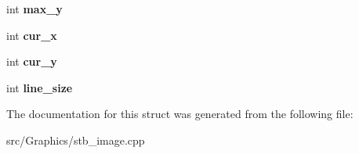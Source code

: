 \begin{DoxyCompactItemize}
\item 
\hypertarget{structstbi__gif__struct_aff3410e0fff097d4719e54096f6da69b}{int {\bfseries max\+\_\+y}}\label{structstbi__gif__struct_aff3410e0fff097d4719e54096f6da69b}

\item 
\hypertarget{structstbi__gif__struct_adbc7ae7e9ff2e2abdf66eb0e1a4b3ffb}{int {\bfseries cur\+\_\+x}}\label{structstbi__gif__struct_adbc7ae7e9ff2e2abdf66eb0e1a4b3ffb}

\item 
\hypertarget{structstbi__gif__struct_ac61865216c4b578c235f5b8170c2036c}{int {\bfseries cur\+\_\+y}}\label{structstbi__gif__struct_ac61865216c4b578c235f5b8170c2036c}

\item 
\hypertarget{structstbi__gif__struct_a5b7d7625c253025ff5ee4169afbf06b7}{int {\bfseries line\+\_\+size}}\label{structstbi__gif__struct_a5b7d7625c253025ff5ee4169afbf06b7}

\end{DoxyCompactItemize}


The documentation for this struct was generated from the following file\+:\begin{DoxyCompactItemize}
\item 
src/\+Graphics/stb\+\_\+image.\+cpp\end{DoxyCompactItemize}
